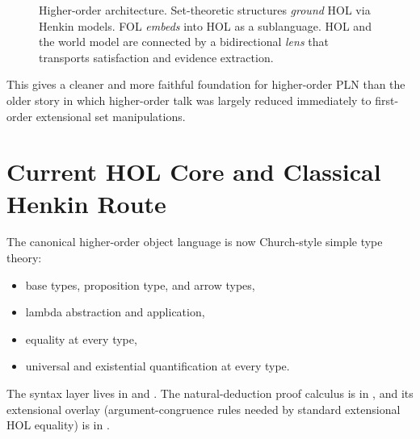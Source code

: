 \documentclass[11pt,openany]{report}
\begin{document}
\begin{figure}[htbp]
\centering
{}
\caption{Higher-order architecture.  Set-theoretic structures \emph{ground}
HOL via Henkin models.  FOL \emph{embeds} into HOL as a sublanguage.  HOL
and the world model are connected by a bidirectional \emph{lens} that
transports satisfaction and evidence extraction.}
\label{fig:higher-order-architecture}
\end{figure}

This gives a cleaner and more faithful foundation for higher-order PLN than
the older story in which higher-order talk was largely reduced immediately to
first-order extensional set manipulations.

\section{Current HOL Core and Classical Henkin Route}

The canonical higher-order object language is now Church-style simple type
theory:
\begin{itemize}
\item base types, proposition type, and arrow types,
\item lambda abstraction and application,
\item equality at every type,
\item universal and existential quantification at every type.
\end{itemize}

The syntax layer lives in
 and
.
The natural-deduction proof calculus is in
, and its extensional overlay
(argument-congruence rules needed by standard extensional HOL equality) is in
.
\end{document}
